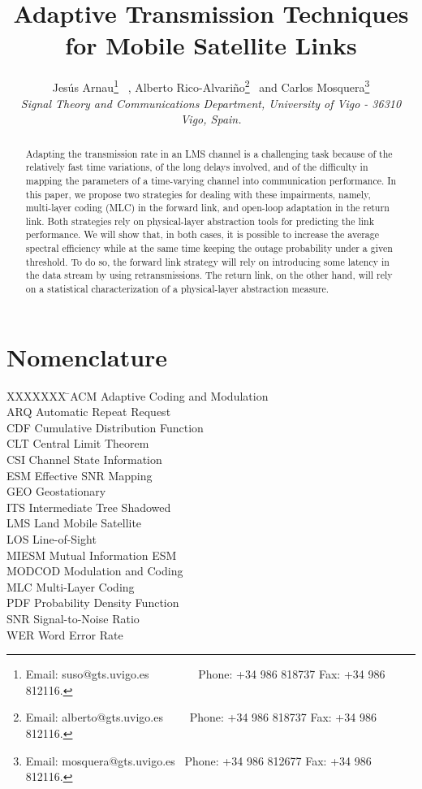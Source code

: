 \documentclass[journal,onecolumn,10pt,a4paper]{IEEEtran}
\title{Adaptive Transmission Techniques for Mobile Satellite Links}
\author{
  Jesús Arnau\thanks{Email: suso@gts.uvigo.es \ \ \ \ \ \ \ \ Phone: +34 986 818737  Fax: +34 986 812116.}
\ ,
  Alberto Rico-Alvariño\thanks{Email: alberto@gts.uvigo.es \ \ \  \ Phone: +34 986 818737 Fax: +34 986 812116.}
  \ and Carlos Mosquera\thanks{Email: mosquera@gts.uvigo.es  \ Phone: +34 986 812677  Fax: +34 986 812116.}\\
  {\normalsize\itshape
   Signal Theory and Communications Department, University of Vigo - 36310 Vigo, Spain.} \\ }
\begin{document}
\maketitle

\begin{abstract}
Adapting the transmission rate in an LMS channel is a challenging task because of the relatively fast time variations, of the long delays involved, and of the difficulty in mapping the parameters of a time-varying channel into communication performance. In this paper, we propose two strategies for dealing with these impairments, namely, multi-layer coding (MLC) in the forward link, and open-loop adaptation in the return link. Both strategies rely on physical-layer abstraction tools for predicting the link performance. We will show that, in both cases, it is possible to increase the average spectral efficiency while at the same time keeping the outage probability under a given threshold. To do so, the forward link strategy will rely on introducing some latency in the data stream by using retransmissions. The return link, on the other hand, will rely on a statistical characterization of a physical-layer abstraction measure.
\end{abstract}
\section*{Nomenclature}
\begin{tabbing}
  XXXXXXX \= \kill ACM \> Adaptive Coding and Modulation\\
  ARQ \> Automatic Repeat Request\\
  CDF \> Cumulative Distribution Function\\
  CLT \> Central Limit Theorem\\
  CSI \> Channel State Information\\
  ESM \> Effective SNR Mapping\\
  GEO \> Geostationary\\
  ITS \> Intermediate Tree Shadowed\\
  LMS \> Land Mobile Satellite\\
  LOS \> Line-of-Sight\\
  MIESM \> Mutual Information ESM\\
  MODCOD \> Modulation and Coding\\
  MLC \> Multi-Layer Coding\\
  PDF \> Probability Density Function\\
  SNR \> Signal-to-Noise Ratio\\
  WER \> Word Error Rate\\
  
 \end{tabbing}
\end{document}
